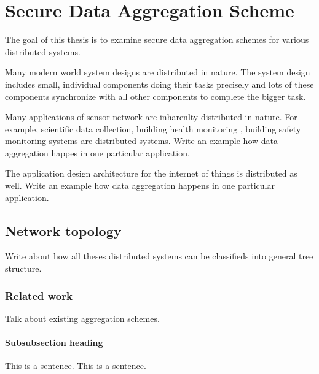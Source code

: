 \chapter{Secure Data Aggregation Scheme}

	The goal of this thesis is to examine secure data aggregation schemes for various distributed systems. 

	Many modern world system designs are distributed in nature. The system design includes small, individual components doing their tasks precisely and lots of these components synchronize with all other components to complete the bigger task.  


	Many applications of sensor network are inharenlty distributed in nature.
	For example, scientific data collection, building health monitoring , building safety monitoring systems are distributed systems.
	Write an example how data aggregation happes in one particular application.\cite{wagner2004resilient}

	The application design architecture for the internet of things is distributed as well. Write an example how data aggregation happens in one particular application.
	\cite{green1982analysis}


%
%
\section{Network topology}

Write about how all theses distributed systems can be classifieds into general tree structure.

\subsection{Related work}

Talk about existing aggregation schemes.

\subsubsection{Subsubsection heading}

This is a sentence.
This is a sentence.

	